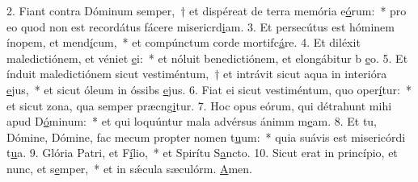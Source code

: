 2. Fiant contra Dóminum semper,~† et dispéreat de terra memória e\uline{ó}rum:~* pro eo quod non est recordátus fácere misericrd\uline{i}am.
3. Et persecútus est hóminem ínopem, et mend\uline{í}cum,~* et compúnctum corde mortifc\uline{á}re.
4. Et diléxit maledictiónem, et véniet \uline{e}i:~* et nóluit benedictiónem, et elongábitur b \uline{e}o.
5. Et índuit maledictiónem sicut vestiméntum,~† et intrávit sicut aqua in interióra \uline{e}jus,~* et sicut óleum in óssibs \uline{e}jus.
6. Fiat ei sicut vestiméntum, quo oper\uline{í}tur:~* et sicut zona, qua semper præcng\uline{i}tur.
7. Hoc opus eórum, qui détrahunt mihi apud D\uline{ó}minum:~* et qui loquúntur mala advérsus ánimm m\uline{e}am.
8. Et tu, Dómine, Dómine, fac mecum propter nomen t\uline{u}um:~* quia suávis est misericórdi t\uline{u}a.
9. Glória Patri, et F\uline{í}lio,~* et Spirítu S\uline{a}ncto.
10. Sicut erat in princípio, et nunc, et s\uline{e}mper,~* et in sǽcula sæculórm. \uline{A}men.
